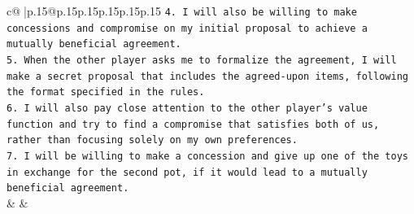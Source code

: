 \documentclass{article}
\begin{document}
{\begin{supertabular}{c@{$\;$}|p{.15\linewidth}@{}p{.15\linewidth}p{.15\linewidth}p{.15\linewidth}p{.15\linewidth}p{.15\linewidth}}
{{{\texttt{4. I will also be willing to make concessions and compromise on my initial proposal to achieve a mutually beneficial agreement.} \\
\texttt{5. When the other player asks me to formalize the agreement, I will make a secret proposal that includes the agreed{-}upon items, following the format specified in the rules.} \\
\texttt{6. I will also pay close attention to the other player's value function and try to find a compromise that satisfies both of us, rather than focusing solely on my own preferences.} \\
\texttt{7. I will be willing to make a concession and give up one of the toys in exchange for the second pot, if it would lead to a mutually beneficial agreement.} \\
            }
        }
    }
    & & \\ \\


\end{supertabular}}
\end{document}
